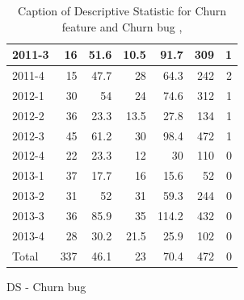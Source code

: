 \documentclass[UKenglish]{ifimaster}  %
\begin{document}
\begin{appendices}
\begin{table}[!htbp]
\begin{adjustwidth}{-1.5cm}{}
\begin{subfigure}[b]{0.3\textwidth}
{\begin{tabular}{ | l | r | r | r | r | r | r | }
 2011-3  & 16 & 51.6 & 10.5 & 91.7 & 309 & 1 \\ \hline
 2011-4  & 15 & 47.7 & 28 & 64.3 & 242 & 2 \\ \hline
 2012-1  & 30 & 54 & 24 & 74.6 & 312 & 1 \\ \hline
 2012-2  & 36 & 23.3 & 13.5 & 27.8 & 134 & 1 \\ \hline
 2012-3  & 45 & 61.2 & 30 & 98.4 & 472 & 1 \\ \hline
 2012-4  & 22 & 23.3 & 12 & 30 & 110 & 0\\ \hline
 2013-1  & 37 & 17.7 & 16 & 15.6 & 52 & 0\\ \hline
 2013-2  & 31 & 52 & 31 & 59.3 & 244 & 0\\ \hline
 2013-3  & 36 & 85.9 & 35 & 114.2 & 432 & 0\\ \hline
 2013-4  & 28 & 30.2 & 21.5 & 25.9 & 102 & 0\\ \hline
 Total  & 337 & 46.1 & 23 & 70.4 & 472 & 0\\ \hline

\end{tabular}
}
\caption{DS - Churn bug}
 \label{DS:CB:9}
\end{subfigure}
\end{adjustwidth}
\caption[Optional caption for list of figures]{Caption of Descriptive Statistic for Churn feature and Churn bug  , }
\label{DS:9:4} %
\end{table}




\end{appendices}
\end{document}
